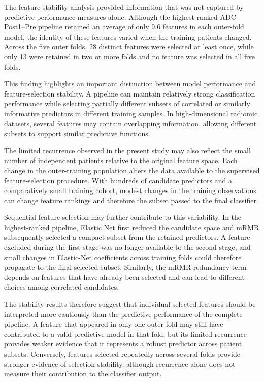 \documentclass[12pt,twocolumn]{article}
\begin{document}
The feature-stability analysis provided information that was not
captured by predictive-performance measures alone. Although the
highest-ranked ADC--Post1--Pre pipeline retained an average of only
9.6 features in each outer-fold model, the identity of these features
varied when the training patients changed. Across the five outer
folds, 28 distinct features were selected at least once, while only
13 were retained in two or more folds and no feature was selected in
all five folds.

This finding highlights an important distinction between model
performance and feature-selection stability. A pipeline can maintain
relatively strong classification performance while selecting
partially different subsets of correlated or similarly informative
predictors in different training samples. In high-dimensional
radiomic datasets, several features may contain overlapping
information, allowing different subsets to support similar predictive
functions.

The limited recurrence observed in the present study may also reflect
the small number of independent patients relative to the original
feature space. Each change in the outer-training population alters
the data available to the supervised feature-selection procedure.
With hundreds of candidate predictors and a comparatively small
training cohort, modest changes in the training observations can
change feature rankings and therefore the subset passed to the final
classifier.

Sequential feature selection may further contribute to this
variability. In the highest-ranked pipeline, Elastic Net first
reduced the candidate space and mRMR subsequently selected a compact
subset from the retained predictors. A feature excluded during the
first stage was no longer available to the second stage, and small
changes in Elastic-Net coefficients across training folds could
therefore propagate to the final selected subset. Similarly, the
mRMR redundancy term depends on features that have already been
selected and can lead to different choices among correlated
candidates.

The stability results therefore suggest that individual selected
features should be interpreted more cautiously than the predictive
performance of the complete pipeline. A feature that appeared in only
one outer fold may still have contributed to a valid predictive model
in that fold, but its limited recurrence provides weaker evidence that
it represents a robust predictor across patient subsets. Conversely,
features selected repeatedly across several folds provide stronger
evidence of selection stability, although recurrence alone does not
measure their contribution to the classifier output.
\end{document}
